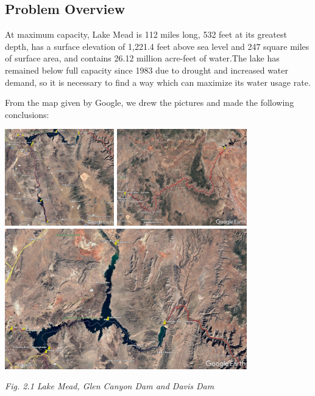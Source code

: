 \documentclass[12pt]{article}
\theoremstyle{definition}
\theoremstyle{remark}
\numberwithin{equation}{section}
\begin{document}
	\subsection{Problem Overview}
		
		At maximum capacity, Lake Mead is 112 miles long, 532 feet at its greatest depth, has a surface elevation of 1,221.4 
		feet above sea level and 247 square miles of surface area, and contains 26.12 million acre-feet of water.The lake has
		remained below full capacity since 1983 due to drought and increased water demand, so it is necessary to find a way
		which can maximize its water usage rate. \cite{Lake Mead}
		
		From the map given by Google, we drew the pictures and made the following conclusions:
		
		\begin{center}
		\includegraphics[height=4.2cm]{2.1a Lake Mead, Glen Canyon Dam and Davis Dam.jpg}
		\includegraphics[height=4.2cm]{2.1b Lake Mead, Glen Canyon Dam and Davis Dam.jpg}
		\includegraphics[width=10.5cm]{2.1c Lake Mead, Glen Canyon Dam and Davis Dam.jpg}

		\small \textit{Fig. 2.1 Lake Mead, Glen Canyon Dam and Davis Dam}
		\end{center}
\end{document}
